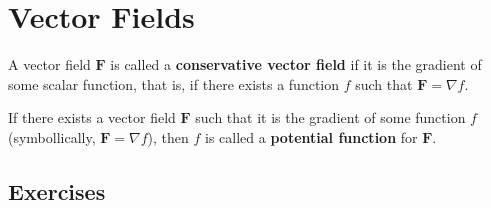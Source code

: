 \section{Vector Fields}
\begin{definition}
	A vector field $\mathbf{F}$ is called a \textbf{conservative vector field} if it is the gradient of some scalar function, that is, if there exists a function $f$ such that $\mathbf{F} = \nabla f$.
\end{definition}
\begin{definition}
	If there exists a vector field $\mathbf{F}$ such that it is the gradient of some function $f$ (symbollically, $\mathbf{F} = \nabla f$), then $f$ is called a \textbf{potential function} for $\mathbf{F}$.
\end{definition}

\subsection{Exercises}
\setcounter{exercise}{20}


